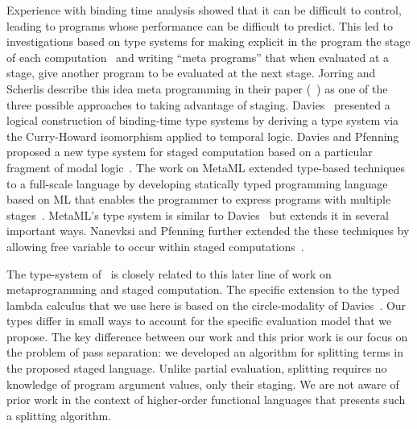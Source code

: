 Experience with binding time analysis showed that it can be difficult
to control, leading to programs whose performance can be difficult to
predict. This led to investigations based on type systems for making
explicit in the program the stage of each
computation~\cite{GJ91-lambda,NN92-twolevel} and writing ``meta
programs'' that when evaluated at a stage, give another program to be
evaluated at the next stage. Jorring and Scherlis describe this idea
meta programming in their paper (~\cite{JS86-staging}) as one of the
three possible approaches to taking advantage of
staging. Davies~\cite{davies96} presented a logical construction of
binding-time type systems by deriving a type system via the
Curry-Howard isomorphism applied to temporal logic.  Davies and
Pfenning proposed a new type system for staged computation based on a
particular fragment of modal logic~\cite{DP01-modal}. The work on
MetaML extended type-based techniques to a full-scale language by
developing statically typed programming language based on ML that
enables the programmer to express programs with multiple
stages~\cite{Taha97,taha-thesis-99}.  MetaML's type system is similar
to Davies~\cite{davies96} but extends it in several important ways.
Nanevksi and Pfenning further extended the these techniques by
allowing free variable to occur within staged
computations~\cite{NP05-nn}.

The type-system of \lang\ is closely related to this later line of
work on metaprogramming and staged computation.  The specific
extension to the typed lambda calculus that we use here is based on
the circle-modality of Davies~\cite{DP01-modal}.  Our types differ in
small ways to account for the specific evaluation model that we
propose.  The key difference between our work and this prior work is
our focus on the problem of pass separation: we developed an algorithm
for splitting terms in the proposed staged language.
%
Unlike partial evaluation, splitting requires no knowledge of program
argument values, only their staging.
We are not aware of prior work in the context of
higher-order functional languages that presents such a splitting
algorithm.


